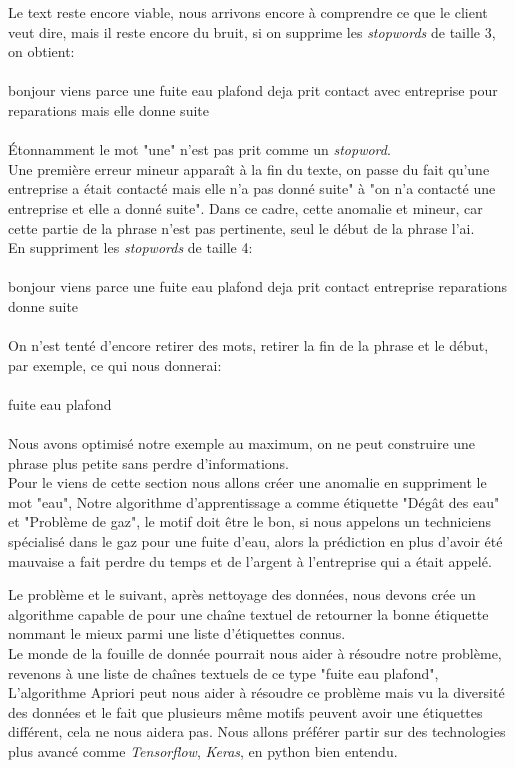 Le text reste encore viable, nous arrivons encore à comprendre ce que le client veut dire, mais il reste encore du bruit, si on supprime les \textit{stopwords} de taille 3, on obtient:\\
\sepline\\
bonjour viens parce une fuite eau plafond deja prit contact avec entreprise pour reparations mais elle donne suite\\
\sepline\\

Étonnamment le mot "une" n'est pas prit comme un \textit{stopword}.\\
Une première erreur mineur apparaît à la fin du texte, on passe du fait qu'une entreprise a était contacté mais elle n'a pas donné suite" à "on n'a contacté une entreprise et elle a donné suite".
Dans ce cadre, cette anomalie et mineur, car cette partie de la phrase n'est pas pertinente, seul le début de la phrase l'ai.\\
En suppriment les \textit{stopwords} de taille 4:\\
\sepline\\
bonjour viens parce une fuite eau plafond deja prit contact entreprise reparations donne suite\\
\sepline\\
On n'est tenté d'encore retirer des mots, retirer la fin de la phrase et le début, par exemple, ce qui nous donnerai:\\
\sepline\\
fuite eau plafond\\
\sepline\\
Nous avons optimisé notre exemple au maximum, on ne peut construire une phrase plus petite sans perdre d'informations.\\
\linebreak
Pour le viens de cette section nous allons créer une anomalie en suppriment le mot "eau", Notre algorithme d'apprentissage a comme étiquette "Dégât des eau" et "Problème de gaz", le motif doit être le bon, si nous appelons un techniciens spécialisé dans le gaz pour une fuite d'eau, alors la prédiction en plus d'avoir été mauvaise a fait perdre du temps et de l'argent à l'entreprise qui a était appelé.\\
\linebreak

Le problème et le suivant, après nettoyage des données, nous devons crée un algorithme capable de pour une chaîne textuel de retourner la bonne étiquette nommant le mieux parmi une liste d'étiquettes connus.\\
Le monde de la fouille de donnée pourrait nous aider à résoudre notre problème, revenons à une liste de chaînes textuels de ce type "fuite eau plafond", L'algorithme Apriori peut nous aider à résoudre ce problème mais vu la diversité des données et le fait que plusieurs même motifs peuvent avoir une étiquettes différent, cela ne nous aidera pas. Nous allons préférer partir sur des technologies plus avancé comme \textit{Tensorflow}, \textit{Keras}, en python bien entendu.
